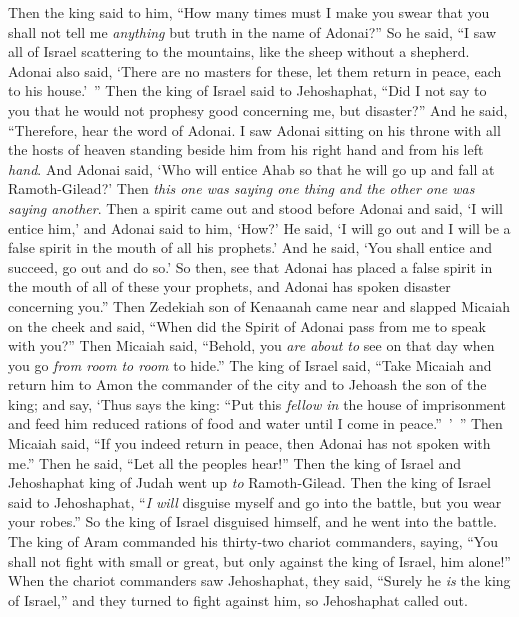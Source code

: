 \begin{biblechapter}
\verse Then the king said to him, “How many times must I make you swear that you shall not tell me \textit{anything} but truth in the name of Adonai?”
\verse So he said, “I saw all of Israel scattering to the mountains, like the sheep without a shepherd. Adonai also said, ‘There are no masters for these, let them return in peace, each to his house.’ ”
\verse Then the king of Israel said to Jehoshaphat, “Did I not say to you that he would not prophesy good concerning me, but disaster?”
\verse And he said, “Therefore, hear the word of Adonai. I saw Adonai sitting on his throne with all the hosts of heaven standing beside him from his right hand and from his left \textit{hand}.
\verse And Adonai said, ‘Who will entice Ahab so that he will go up and fall at Ramoth-Gilead?’ Then \textit{this one was saying one thing and the other one was saying another}.
\verse Then a spirit came out and stood before Adonai and said, ‘I will entice him,’ and Adonai said to him, ‘How?’
\verse He said, ‘I will go out and I will be a false spirit in the mouth of all his prophets.’ And he said, ‘You shall entice and succeed, go out and do so.’
\verse So then, see that Adonai has placed a false spirit in the mouth of all of these your prophets, and Adonai has spoken disaster concerning you.”
\verse Then Zedekiah son of Kenaanah came near and slapped Micaiah on the cheek and said, “When did the Spirit of Adonai pass from me to speak with you?”
\verse Then Micaiah said, “Behold, you \textit{are about to} see on that day when you go \textit{from room to room} to hide.”
\verse The king of Israel said, “Take Micaiah and return him to Amon the commander of the city and to Jehoash the son of the king;
\verse and say, ‘Thus says the king: “Put this \textit{fellow in} the house of imprisonment and feed him reduced rations of food and water until I come in peace.” ’ ”
\verse Then Micaiah said, “If you indeed return in peace, then Adonai has not spoken with me.” Then he said, “Let all the peoples hear!”
\verse Then the king of Israel and Jehoshaphat king of Judah went up \textit{to} Ramoth-Gilead.
\verse Then the king of Israel said to Jehoshaphat, “\textit{I will} disguise myself and go into the battle, but you wear your robes.” So the king of Israel disguised himself, and he went into the battle.
\verse The king of Aram commanded his thirty-two chariot commanders, saying, “You shall not fight with small or great, but only against the king of Israel, him alone!”
\verse When the chariot commanders saw Jehoshaphat, they said, “Surely he \textit{is} the king of Israel,” and they turned to fight against him, so Jehoshaphat called out.

\end{biblechapter}
